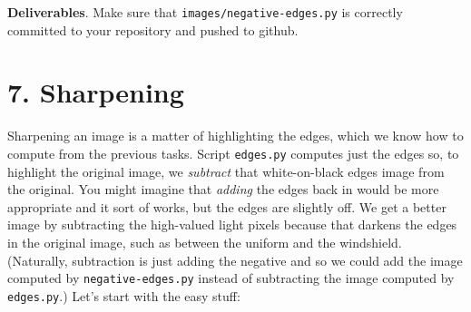 \begin{minipage}{\linewidth}
\end{minipage}

\begin{callout}{\bcplume}
{\bf Deliverables}. Make sure that {\tt images/negative-edges.py} is correctly committed to your repository and pushed to github.
\end{callout}

\section{7. Sharpening}

Sharpening an image is a matter of highlighting the edges, which we know how to compute from the previous tasks. Script {\tt edges.py} computes just the edges so, to highlight the original image, we {\em subtract} that white-on-black edges image from the original.  You might imagine that {\em adding} the edges back in would be more appropriate and it sort of works, but the edges are slightly off. We get a better image by subtracting the high-valued light pixels because that darkens the edges in the original image, such as between the uniform and the windshield. (Naturally, subtraction is just adding the negative and so we could add the image computed by {\tt negative-edges.py} instead of subtracting the image computed by {\tt edges.py}.) Let's start with the easy stuff:

